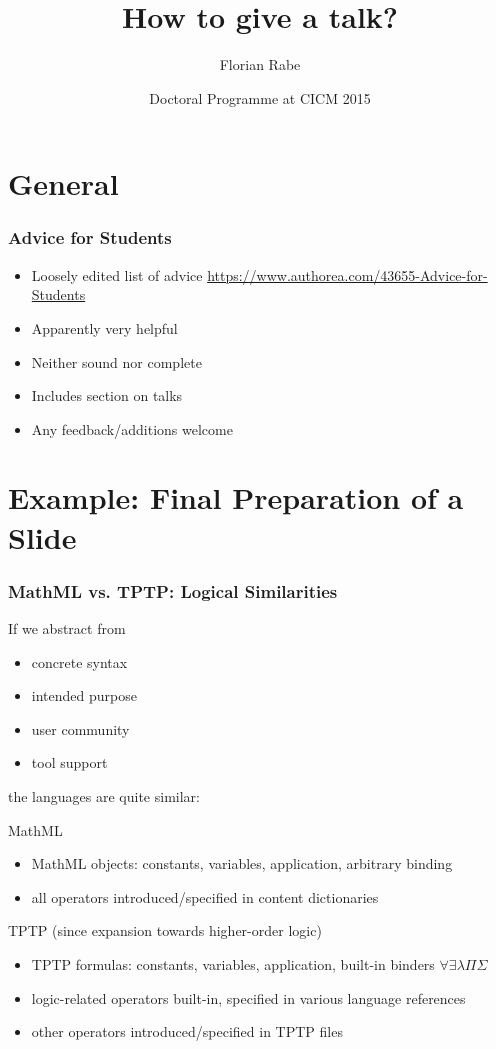 \documentclass{beamer}
\begin{document}
\title{How to give a talk?}
\author{Florian Rabe}
\date{Doctoral Programme at CICM 2015}
\begin{frame}
    \titlepage
\end{frame}

\section{General}

\begin{frame}\frametitle{Advice for Students}
\begin{itemize}
  \item Loosely edited list of advice
  \url{https://www.authorea.com/43655-Advice-for-Students}
  \item Apparently very helpful
  \item Neither sound nor complete
  \item Includes section on talks
  \item Any feedback/additions welcome
\end{itemize}
\end{frame}

\section{Example: Final Preparation of a Slide}

\begin{frame}\frametitle{MathML vs. TPTP: Logical Similarities}
If we abstract from
\begin{itemize}
  \item concrete syntax
  \item intended purpose
  \item user community
  \item tool support
\end{itemize}
the languages are quite similar:

MathML
\begin{itemize}
 \item MathML objects: constants, variables, application, arbitrary binding
 \item all operators introduced/specified in content dictionaries
\end{itemize}
TPTP (since expansion towards higher-order logic)
\begin{itemize}
 \item TPTP formulas: constants, variables, application, built-in binders $\forall\exists\lambda\Pi\Sigma$
 \item logic-related operators built-in, specified in various language references
 \item other operators introduced/specified in TPTP files
\end{itemize}
\end{frame}
\end{document}
